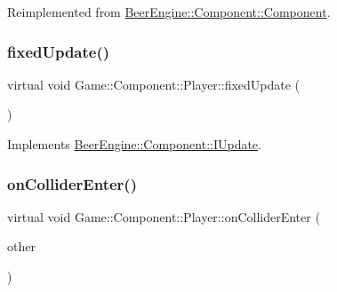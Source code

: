 Reimplemented from \mbox{\hyperlink{class_beer_engine_1_1_component_1_1_component_a044d30f65879a1467f44aa3eb8ad7bce}{Beer\+Engine\+::\+Component\+::\+Component}}.

\mbox{\label{class_game_1_1_component_1_1_player_aacbb2bc974b4b81434abd49eb8f91999}} 
\subsubsection{\texorpdfstring{fixed\+Update()}{fixedUpdate()}}
{\footnotesize\ttfamily virtual void Game\+::\+Component\+::\+Player\+::fixed\+Update (\begin{DoxyParamCaption}\item[{void}]{ }\end{DoxyParamCaption})\hspace{0.3cm}{\ttfamily [virtual]}}



Implements \mbox{\hyperlink{class_beer_engine_1_1_component_1_1_i_update_a615c127a4729f73713e5eaeee538854b}{Beer\+Engine\+::\+Component\+::\+I\+Update}}.

\mbox{\label{class_game_1_1_component_1_1_player_a68981bff23caf1fa65ea9a9007265b54}} 
\subsubsection{\texorpdfstring{on\+Collider\+Enter()}{onColliderEnter()}}
{\footnotesize\ttfamily virtual void Game\+::\+Component\+::\+Player\+::on\+Collider\+Enter (\begin{DoxyParamCaption}\item[{\mbox{\hyperlink{class_beer_engine_1_1_component_1_1_a_collider}{Beer\+Engine\+::\+Component\+::\+A\+Collider}} $\ast$}]{other }\end{DoxyParamCaption})\hspace{0.3cm}{\ttfamily [virtual]}}



